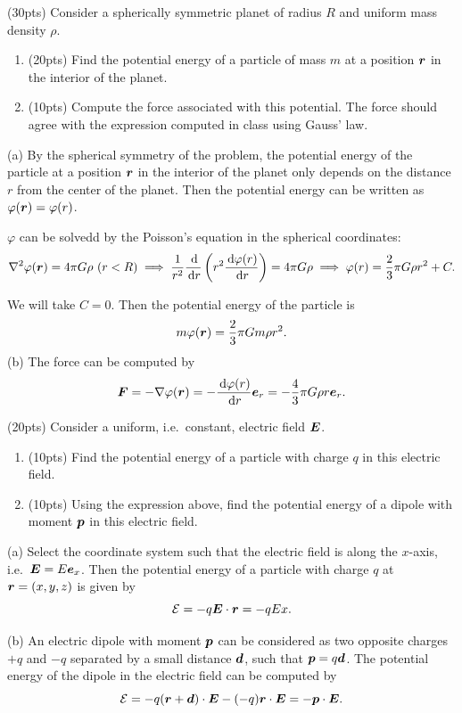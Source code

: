 \documentclass{article}
\begin{document}
\begin{problem}
(30pts) Consider a spherically symmetric planet of radius $R$ and uniform mass density $\rho$.
\begin{enumerate}[label=(\alph*)]
	\item (20pts) Find the potential energy of a particle of mass $m$ at a position $\boldsymbol{r}$ in the interior of the planet.
	\item (10pts) Compute the force associated with this potential. The force should agree with the expression computed in class using Gauss' law.
\end{enumerate}
\end{problem}

\begin{solution}
  (a) By the spherical symmetry of the problem, the potential energy of the particle at a position $\boldsymbol{r}$ in the interior of the planet only depends on the distance $r$ from the center of the planet. Then the potential energy can be written as \( \varphi(\boldsymbol{r})=\varphi(r) \).\par
  \( \varphi \) can be solvedd by the Poisson's equation in the spherical coordinates:
  \[ \nabla^2\varphi(\bo{r})= 4\pi G \rho\ (r<R) 
  \implies \frac{1}{r^2}\frac{\d}{\d r}\left( r^2\frac{\d \varphi(r)}{\d r}\right)=4\pi G\rho 
  \implies \varphi(r) = \frac{2}{3}\pi G \rho r^2+C. \]\par
  We will take \( C=0 \). Then the potential energy of the particle is
  \[ m\varphi(\boldsymbol{r}) = \frac{2}{3}\pi G m \rho r^2. \]
  (b) The force can be computed by
  \[ \boldsymbol{F}=-\nabla\varphi(\boldsymbol{r})= -\frac{\,\mathrm{d} \varphi(r)}{\,\mathrm{d} r}\boldsymbol{e}_r = -\frac{4}{3}\pi G \rho r \boldsymbol{e}_r. \]
\end{solution}



\begin{problem}
(20pts) Consider a uniform, i.e.\ constant, electric field $\boldsymbol{E}$.
\begin{enumerate}[label=(\alph*)]
	\item (10pts) Find the potential energy of a particle with charge $q$ in this electric field.
	\item (10pts) Using the expression above, find the potential energy of a dipole with moment $\boldsymbol{p}$ in this electric field.
\end{enumerate}
\end{problem}

\begin{solution}
  (a) Select the coordinate system such that the electric field is along the $x$-axis, i.e.\ $\boldsymbol{E}=E\boldsymbol{e}_x$. Then the potential energy of a particle with charge $q$ at \( \boldsymbol{r}=(x,y,z) \) is given by
  \[ \mathcal{E} = -q\boldsymbol{E} \cdot \boldsymbol{r} = -qEx. \]\par
  (b) An electric dipole with moment \( \boldsymbol{p} \) can be considered as two opposite charges \( +q \) and \( -q \) separated by a small distance \( \boldsymbol{d} \), such that \( \boldsymbol{p}=q\boldsymbol{d} \). The potential energy of the dipole in the electric field can be computed by
  \[ \mathcal{E} = -q (\boldsymbol{r}+\boldsymbol{d})\cdot\boldsymbol{E}-(-q)\boldsymbol{r}\cdot\boldsymbol{E}= -\boldsymbol{p} \cdot \boldsymbol{E}. \]
\end{solution}
\end{document}
